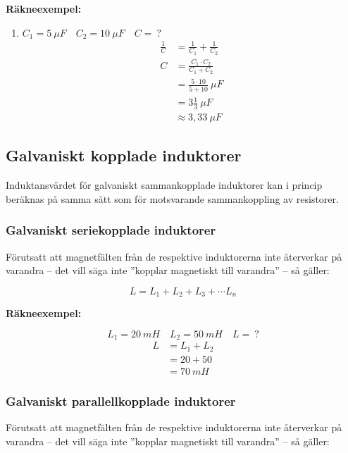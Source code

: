 \textbf{Räkneexempel:}

\begin{enumerate}
  \item \(C_1 = 5\ \mu F \quad C_2 = 10\ \mu F \quad C =\ ?\)
    \begin{align*}
      \frac{1}{C} &= \frac{1}{C_1} + \frac{1}{C_2} \\
      C &= \frac{C_1 \cdot C_2}{C_1 + C_2} \\
      &= \frac{5 \cdot 10}{5 + 10}\ \mu F \\
      &= 3\frac{1}{3}\ \mu F \\
      &\approx 3,33\ \mu F
    \end{align*}
\end{enumerate}

\subsection{Galvaniskt kopplade induktorer}

Induktansvärdet för galvaniskt sammankopplade induktorer kan i princip
beräknas på samma sätt som för motsvarande sammankoppling av resistorer.

\subsubsection{Galvaniskt seriekopplade induktorer}

Förutsatt att magnetfälten från de respektive induktorerna inte återverkar på
varandra -- det vill säga inte ''kopplar magnetiskt till varandra'' -- så
gäller:

\[L = L_1 + L_2 + L_3 + \cdots L_n\]

\textbf{Räkneexempel:}

\[L_1 = 20\ mH \quad L_2 = 50\ mH \quad L =\ ?\]
\begin{align*}
  L &= L_1 + L_2 \\
  & = 20 + 50 \\
  &= 70\ mH
\end{align*}

\subsubsection{Galvaniskt parallellkopplade induktorer}

Förutsatt att magnetfälten från de respektive induktorerna inte återverkar på
varandra -- det vill säga inte ''kopplar magnetiskt till varandra'' -- så
gäller:

